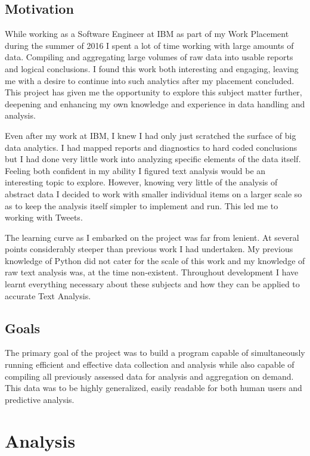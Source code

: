 \documentclass[12pt,a4paper]{report}
\begin{document}
  \section{Motivation}
    While working as a Software Engineer at IBM\cite{IBM} as part of my Work Placement during the summer of 2016 I spent a lot of time working with large amounts of data. Compiling and aggregating large volumes of raw data into usable reports and logical conclusions. I found this work both interesting and engaging, leaving me with a desire to continue into such analytics after my placement concluded. This project has given me the opportunity to explore this subject matter further, deepening and enhancing my own knowledge and experience in data handling and analysis.
    \par
    Even after my work at IBM, I knew I had only just scratched the surface of big data analytics. I had mapped reports and diagnostics to hard coded conclusions but I had done very little work into analyzing specific elements of the data itself. Feeling both confident in my ability I figured text analysis would be an interesting topic to explore. However, knowing very little of the analysis of abstract data I decided to work with smaller individual items on a larger scale so as to keep the analysis itself simpler to implement and run. This led me to working with Tweets.
    \par
    The learning curve as I embarked on the project was far from lenient. At several points considerably steeper than previous work I had undertaken. My previous knowledge of Python did not cater for the scale of this work and my knowledge of raw text analysis was, at the time non-existent. Throughout development I have learnt everything necessary about these subjects and how they can be applied to accurate Text Analysis.
  \section{Goals}
    The primary goal of the project was to build a program capable of simultaneously running efficient and effective data collection and analysis while also capable of compiling all previously assessed data for analysis and aggregation on demand. This data was to be highly generalized, easily readable for both human users and predictive analysis. 
  

\chapter{Analysis}
\end{document}
